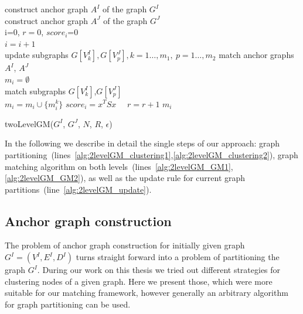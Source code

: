 \begin{algorithm}[h]
	construct anchor graph $A^I$ of the graph $G^I$ \label{alg:2levelGM_clustering1}\\
	construct anchor graph $A^J$ of the graph $G^J$ \label{alg:2levelGM_clustering2}\\
	i=0, $r=0$, $score_i$=0\\
	{ $i=i+1$ \\
	  {update subgraphs $G[V^I_k],G[V^J_p],k=1\dots,m_1,\ p=1\dots,m_2$ \label{alg:2levelGM_update}}
	  match anchor graphs $A^I$, $A^J$ \label{alg:2levelGM_GM1} \\
	  $m_i=\emptyset$\\
	  {match subgraphs $G[V^I_k]$,$G[V^J_p]$ \label{alg:2levelGM_GM2}\\
	   $m_i=m_i\cup\{m^k_i\}$\hspace{55pt}
	  }
	  $score_i=x^TSx$\ \ 
	  {$r=r+1$}
	}
	\Return $m_i$
	\caption{twoLevelGM($G^I$, $G^J$, $N$, $R$, $\epsilon$)} \label{alg:2levelGM}
\end{algorithm}

In the following we describe in detail the single steps of our approach: %
graph partitioning~(lines~\ref{alg:2levelGM_clustering1},\ref{alg:2levelGM_clustering2}), graph matching algorithm on both levels~(lines~\ref{alg:2levelGM_GM1},\ref{alg:2levelGM_GM2}), as well as the update rule for current graph partitions~(line~\ref{alg:2levelGM_update}).
\subsection{Anchor graph construction} \label{subgraphInit}
The problem of anchor graph construction for initially given graph $G^I=(V^I,E^I,D^I)$ turns straight forward into a problem of partitioning the graph $G^I$. During our work on this thesis we tried out different strategies for clustering nodes of a given graph. Here we present those, which were more suitable for our matching framework, however generally an arbitrary algorithm for graph partitioning can be used.

